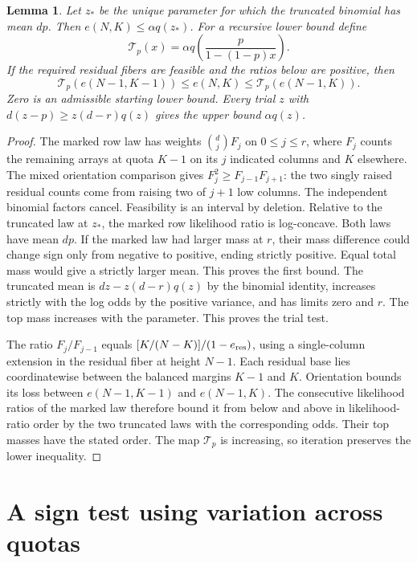 \documentclass[11pt]{article}
\newtheorem{lemma}[theorem]{Lemma}
\begin{document}
\begin{lemma}\label{sand}
Let $z_*$ be the unique parameter for which the truncated binomial has mean $dp$. Then $e(N,K)\le\alpha q(z_*)$. For a recursive lower bound define
\[
\mathcal T_p(x)=\alpha q\!\left(\frac p{1-(1-p)x}\right).
\]
If the required residual fibers are feasible and the ratios below are positive, then
\[
\mathcal T_p(e(N-1,K-1))\le e(N,K)\le\mathcal T_p(e(N-1,K)).
\]
Zero is an admissible starting lower bound. Every trial $z$ with $d(z-p)\ge z(d-r)q(z)$ gives the upper bound $\alpha q(z)$.
\end{lemma}
\begin{proof}
The marked row law has weights $\binom djF_j$ on $0\le j\le r$, where $F_j$ counts the remaining arrays at quota $K-1$ on its $j$ indicated columns and $K$ elsewhere. The mixed orientation comparison gives $F_j^2\ge F_{j-1}F_{j+1}$: the two singly raised residual counts come from raising two of $j+1$ low columns. The independent binomial factors cancel. Feasibility is an interval by deletion. Relative to the truncated law at $z_*$, the marked row likelihood ratio is log-concave. Both laws have mean $dp$. If the marked law had larger mass at $r$, their mass difference could change sign only from negative to positive, ending strictly positive. Equal total mass would give a strictly larger mean. This proves the first bound. The truncated mean is $dz-z(d-r)q(z)$ by the binomial identity, increases strictly with the log odds by the positive variance, and has limits zero and $r$. The top mass increases with the parameter. This proves the trial test.

The ratio $F_j/F_{j-1}$ equals $[K/(N-K)]/(1-e_{\rm res})$, using a single-column extension in the residual fiber at height $N-1$. Each residual base lies coordinatewise between the balanced margins $K-1$ and $K$. Orientation bounds its loss between $e(N-1,K-1)$ and $e(N-1,K)$. The consecutive likelihood ratios of the marked law therefore bound it from below and above in likelihood-ratio order by the two truncated laws with the corresponding odds. Their top masses have the stated order. The map $\mathcal T_p$ is increasing, so iteration preserves the lower inequality.
\end{proof}

\section{A sign test using variation across quotas}
\end{document}
